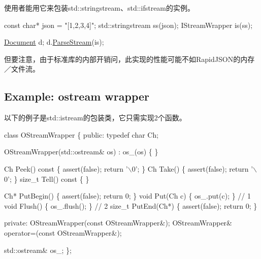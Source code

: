 使用者能用它来包装{\ttfamily std\+::stringstream}、{\ttfamily std\+::ifstream}的实例。


\begin{DoxyCode}
\textcolor{keyword}{const} \textcolor{keywordtype}{char}* json = \textcolor{stringliteral}{"[1,2,3,4]"};
std::stringstream ss(json);
IStreamWrapper is(ss);

\hyperlink{class_generic_document}{Document} d;
d.\hyperlink{class_generic_document_afe94c0abc83a20f2d7dc1ba7677e6238}{ParseStream}(is);
\end{DoxyCode}


但要注意，由于标准库的内部开销问，此实现的性能可能不如\+Rapid\+J\+S\+O\+N的内存／文件流。\hypertarget{md_Cadriciel_Commun_Externe_RapidJSON_doc_stream.zh-cn_ExampleOStreamWrapper}{}\subsection{Example\+: ostream wrapper}\label{md_Cadriciel_Commun_Externe_RapidJSON_doc_stream.zh-cn_ExampleOStreamWrapper}
以下的例子是{\ttfamily std\+::istream}的包装类，它只需实现2个函数。


\begin{DoxyCode}
\textcolor{keyword}{class }OStreamWrapper \{
\textcolor{keyword}{public}:
    \textcolor{keyword}{typedef} \textcolor{keywordtype}{char} Ch;

    OStreamWrapper(std::ostream& os) : os\_(os) \{
    \}

    Ch Peek()\textcolor{keyword}{ const }\{ assert(\textcolor{keyword}{false}); \textcolor{keywordflow}{return} \textcolor{charliteral}{'\(\backslash\)0'}; \}
    Ch Take() \{ assert(\textcolor{keyword}{false}); \textcolor{keywordflow}{return} \textcolor{charliteral}{'\(\backslash\)0'}; \}
    \textcolor{keywordtype}{size\_t} Tell()\textcolor{keyword}{ const }\{  \}

    Ch* PutBegin() \{ assert(\textcolor{keyword}{false}); \textcolor{keywordflow}{return} 0; \}
    \textcolor{keywordtype}{void} Put(Ch c) \{ os\_.put(c); \}                  \textcolor{comment}{// 1}
    \textcolor{keywordtype}{void} Flush() \{ os\_.flush(); \}                   \textcolor{comment}{// 2}
    \textcolor{keywordtype}{size\_t} PutEnd(Ch*) \{ assert(\textcolor{keyword}{false}); \textcolor{keywordflow}{return} 0; \}

\textcolor{keyword}{private}:
    OStreamWrapper(\textcolor{keyword}{const} OStreamWrapper&);
    OStreamWrapper& operator=(\textcolor{keyword}{const} OStreamWrapper&);

    std::ostream& os\_;
\};
\end{DoxyCode}


